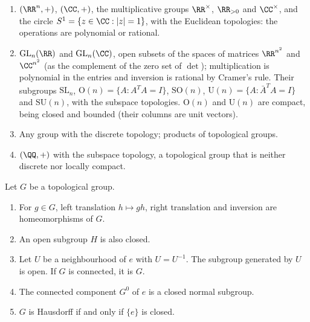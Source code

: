 \begin{example}\label{topological-manifolds:example-topological-groups}
\begin{enumerate}
\item $(\RR^n, +)$, $(\CC, +)$, the multiplicative groups $\RR^\times$, $\RR_{>0}$ and $\CC^\times$, and the circle $S^1 = \{z \in \CC : |z| = 1\}$, with the Euclidean topologies: the operations are polynomial or rational.
\item $\mathrm{GL}_n(\RR)$ and $\mathrm{GL}_n(\CC)$, open subsets of the spaces of matrices $\RR^{n^2}$ and $\CC^{n^2}$ (as the complement of the zero set of $\det$); multiplication is polynomial in the entries and inversion is rational by
Cramer's rule. Their subgroups $\mathrm{SL}_n$, $\mathrm{O}(n) = \{A : A^TA = I\}$, $\mathrm{SO}(n)$, $\mathrm{U}(n) = \{A : \bar A^TA = I\}$ and $\mathrm{SU}(n)$, with the subspace topologies. $\mathrm{O}(n)$ and $\mathrm{U}(n)$ are
compact, being closed and bounded (their columns are unit vectors).
\item Any group with the discrete topology; products of topological groups.
\item $(\QQ, +)$ with the subspace topology, a topological group that is neither discrete nor locally compact.
\end{enumerate}
\end{example}

\begin{proposition}\label{topological-manifolds:proposition-topological-groups}
Let $G$ be a topological group.
\begin{enumerate}
\item For $g \in G$, left translation $h \mapsto gh$, right translation and inversion are homeomorphisms of $G$.
\item An open subgroup $H$ is also closed.
\item Let $U$ be a neighbourhood of $e$ with $U = U^{-1}$. The subgroup generated by $U$ is open. If $G$ is connected, it is $G$.
\item The connected component $G^0$ of $e$ is a closed normal subgroup.
\item $G$ is Hausdorff if and only if $\{e\}$ is closed.
\end{enumerate}
\end{proposition}


